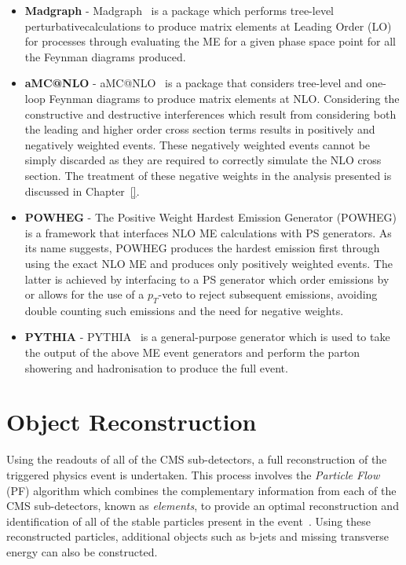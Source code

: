 \begin{itemize}
\item \textbf{Madgraph} - Madgraph~\cite{Alwall:2011uj} is a package which performs tree-level perturbativecalculations to produce matrix elements at Leading Order (LO) for processes through evaluating the ME for a given phase space point for all the Feynman diagrams produced.
\item \textbf{aMC@NLO} - aMC@NLO~\cite{Alwall:2014hca} is a package that considers tree-level and one-loop Feynman diagrams to produce matrix elements at NLO.
Considering the constructive and destructive interferences which result from considering both the leading and higher order cross section terms results in positively and negatively weighted events.
These negatively weighted events cannot be simply discarded as they are required to correctly simulate the NLO cross section.
The treatment of these negative weights in the analysis presented is discussed in Chapter~\ref{}.
\item \textbf{POWHEG} - The Positive Weight Hardest Emission Generator (POWHEG)~\cite{Alioli:2010xd} is a framework that interfaces NLO ME calculations with PS generators.
As its name suggests, POWHEG produces the hardest emission first through using the exact NLO ME and produces only positively weighted events.
The latter is achieved by interfacing to a PS generator which order emissions by \pT or allows for the use of a $p_{T}$-veto to reject subsequent emissions, avoiding double counting such emissions and the need for negative weights.
\item \textbf{PYTHIA} - PYTHIA~\cite{Sjostrand:2014zea} is a general-purpose generator which is used to take the output of the above ME event generators and perform the parton showering and hadronisation to produce the full event.
\end{itemize}

\section{Object Reconstruction}\label{sec:reco}
Using the readouts of all of the CMS sub-detectors, a full reconstruction of the triggered physics event is undertaken.
This process involves the \emph{Particle Flow} (PF) algorithm which combines the complementary information from each of the CMS sub-detectors, known as \emph{elements}, to provide an optimal reconstruction and identification of all of the stable particles present in the event~\cite{CMS:2009nxa,CMS:2010eua,CMS-PRF-14-001}.
Using these reconstructed particles, additional objects such as b-jets and missing transverse energy can also be constructed.

